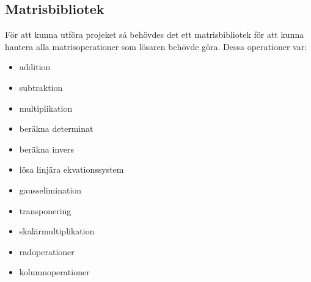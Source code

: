 \subsection{Matrisbibliotek}
För att kunna utföra projeket så behövdes det ett matrisbibliotek för att kunna hantera alla matrisoperationer som lösaren behövde göra. Dessa operationer var:
\begin{itemize}

\item addition
\item subtraktion
\item multiplikation
\item beräkna determinat
\item beräkna invers
\item lösa linjära ekvationssystem
\item gausselimination
\item transponering
\item skalärmultiplikation
\item radoperationer
\item kolumnoperationer

\end{itemize}


